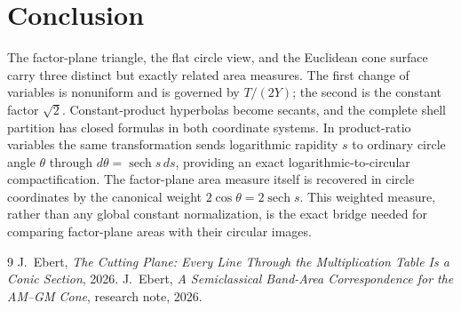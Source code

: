 \documentclass[11pt]{amsart}
\theoremstyle{remark}
\begin{document}
\section{Conclusion}
The factor-plane triangle, the flat circle view, and the Euclidean cone surface carry three distinct but exactly related area measures. The first change of variables is nonuniform and is governed by $T/(2Y)$; the second is the constant factor $\sqrt2$. Constant-product hyperbolas become secants, and the complete shell partition has closed formulas in both coordinate systems. In product-ratio variables the same transformation sends logarithmic rapidity $s$ to ordinary circle angle $\theta$ through $d\theta=\operatorname{sech}s\,ds$, providing an exact logarithmic-to-circular compactification. The factor-plane area measure itself is recovered in circle coordinates by the canonical weight $2\cos\theta=2\operatorname{sech}s$. This weighted measure, rather than any global constant normalization, is the exact bridge needed for comparing factor-plane areas with their circular images.

\begin{thebibliography}{9}
 J.~Ebert, \emph{The Cutting Plane: Every Line Through the Multiplication Table Is a Conic Section}, 2026.
 J.~Ebert, \emph{A Semiclassical Band-Area Correspondence for the AM--GM Cone}, research note, 2026.
\end{thebibliography}
\end{document}
